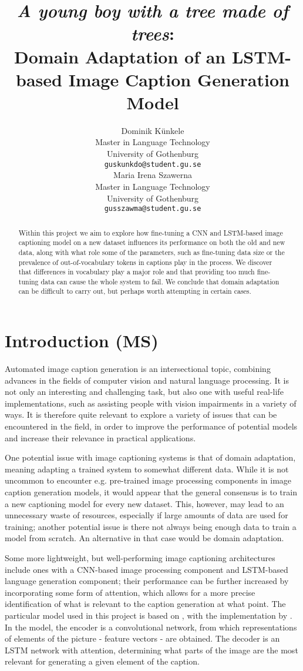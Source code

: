\documentclass[11pt]{article}
\title{\textit{A young boy with a tree made of trees}: \\ Domain Adaptation of an LSTM-based Image Caption Generation Model}
\author{Dominik Künkele \\
  Master in Language Technology \\
  University of Gothenburg \\
  \texttt{guskunkdo@student.gu.se} \\\And
  Maria Irena Szawerna \\
  Master in Language Technology \\
  University of Gothenburg \\
  \texttt{gusszawma@student.gu.se} \\}
\begin{document}
\maketitle
\begin{abstract}

    Within this project we aim to explore how fine-tuning a CNN and LSTM-based image captioning model on a new dataset influences its performance on both the old and new data, along with what role some of the parameters, such as fine-tuning data size or the prevalence of out-of-vocabulary tokens in captions play in the process. We discover that differences in vocabulary play a major role and that providing too much fine-tuning data can cause the whole system to fail. We conclude that domain adaptation can be difficult to carry out, but perhaps worth attempting in certain cases.

\end{abstract}

\section{Introduction (MS)}

Automated image caption generation is an intersectional topic, combining advances in the fields of computer vision and natural language processing. It is not only an interesting and challenging task, but also one with useful real-life implementations, such as assisting people with vision impairments in a variety of ways. It is therefore quite relevant to explore a variety of issues that can be encountered in the field, in order to improve the performance of potential models and increase their relevance in practical applications.

One potential issue with image captioning systems is that of domain adaptation, meaning adapting a trained system to somewhat different data. While it is not uncommon to encounter e.g. pre-trained image processing components in image caption generation models, it would appear that the general consensus is to train a new captioning model for every new dataset. This, however, may lead to an unnecessary waste of resources, especially if large amounts of data are used for training; another potential issue is there not always being enough data to train a model from scratch. An alternative in that case would be domain adaptation.

Some more lightweight, but well-performing image captioning architectures include ones with a CNN-based image processing component and LSTM-based language generation component; their performance can be further increased by incorporating some form of attention, which allows for a more precise identification of what is relevant to the caption generation at what point. The particular model used in this project is based on \cite{xu2015attend}, with the implementation by \cite{ilinykh}. In the model, the encoder is a convolutional network, from which representations of elements of the picture - feature vectors - are obtained. The decoder is an LSTM network with attention, determining what parts of the image are the most relevant for generating a given element of the caption.
\end{document}
